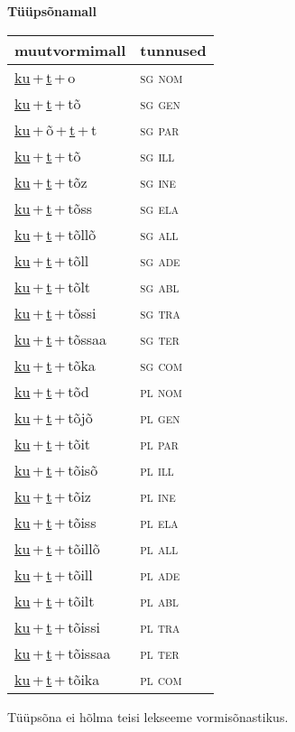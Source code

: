 
\vspace{1.8em}
\begin{minipage}{\textwidth}
\textbf{Tüüpsõnamall \,}\\

\begin{sideways}
\begin{tabular}{l l}
muutvormimall & tunnused \\
\hline
\underline{ku}\,+\,\underline{t}\,+\,o & \textsc{ sg nom } \\
\underline{ku}\,+\,\underline{t}\,+\,tõ & \textsc{ sg gen } \\
\underline{ku}\,+\,õ\,+\,\underline{t}\,+\,t & \textsc{ sg par } \\
\underline{ku}\,+\,\underline{t}\,+\,tõ & \textsc{ sg ill } \\
\underline{ku}\,+\,\underline{t}\,+\,tõz & \textsc{ sg ine } \\
\underline{ku}\,+\,\underline{t}\,+\,tõss & \textsc{ sg ela } \\
\underline{ku}\,+\,\underline{t}\,+\,tõllõ & \textsc{ sg all } \\
\underline{ku}\,+\,\underline{t}\,+\,tõll & \textsc{ sg ade } \\
\underline{ku}\,+\,\underline{t}\,+\,tõlt & \textsc{ sg abl } \\
\underline{ku}\,+\,\underline{t}\,+\,tõssi & \textsc{ sg tra } \\
\underline{ku}\,+\,\underline{t}\,+\,tõssaa & \textsc{ sg ter } \\
\underline{ku}\,+\,\underline{t}\,+\,tõka & \textsc{ sg com } \\
\underline{ku}\,+\,\underline{t}\,+\,tõd & \textsc{ pl nom } \\
\underline{ku}\,+\,\underline{t}\,+\,tõjõ & \textsc{ pl gen } \\
\underline{ku}\,+\,\underline{t}\,+\,tõit & \textsc{ pl par } \\
\underline{ku}\,+\,\underline{t}\,+\,tõisõ & \textsc{ pl ill } \\
\underline{ku}\,+\,\underline{t}\,+\,tõiz & \textsc{ pl ine } \\
\underline{ku}\,+\,\underline{t}\,+\,tõiss & \textsc{ pl ela } \\
\underline{ku}\,+\,\underline{t}\,+\,tõillõ & \textsc{ pl all } \\
\underline{ku}\,+\,\underline{t}\,+\,tõill & \textsc{ pl ade } \\
\underline{ku}\,+\,\underline{t}\,+\,tõilt & \textsc{ pl abl } \\
\underline{ku}\,+\,\underline{t}\,+\,tõissi & \textsc{ pl tra } \\
\underline{ku}\,+\,\underline{t}\,+\,tõissaa & \textsc{ pl ter } \\
\underline{ku}\,+\,\underline{t}\,+\,tõika & \textsc{ pl com } \\
\end{tabular}
\end{sideways}
\label{tab:tüüpsõnamall-kuto}

\end{minipage}

 
\vspace{1em}
\noindent Tüüpsõna ei hõlma teisi lekseeme vormi\-sõnastikus.
